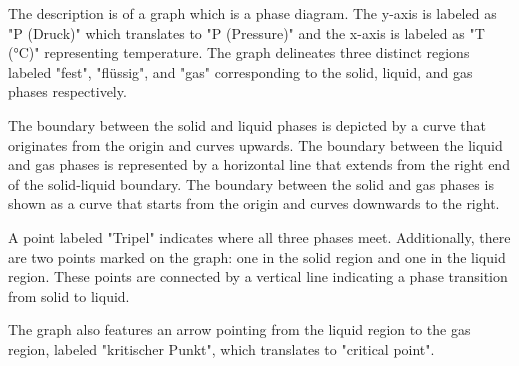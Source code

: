 The description is of a graph which is a phase diagram. The y-axis is labeled as "P (Druck)" which translates to "P (Pressure)" and the x-axis is labeled as "T (°C)" representing temperature. The graph delineates three distinct regions labeled "fest", "flüssig", and "gas" corresponding to the solid, liquid, and gas phases respectively.

The boundary between the solid and liquid phases is depicted by a curve that originates from the origin and curves upwards. The boundary between the liquid and gas phases is represented by a horizontal line that extends from the right end of the solid-liquid boundary. The boundary between the solid and gas phases is shown as a curve that starts from the origin and curves downwards to the right.

A point labeled "Tripel" indicates where all three phases meet. Additionally, there are two points marked on the graph: one in the solid region and one in the liquid region. These points are connected by a vertical line indicating a phase transition from solid to liquid.

The graph also features an arrow pointing from the liquid region to the gas region, labeled "kritischer Punkt", which translates to "critical point".